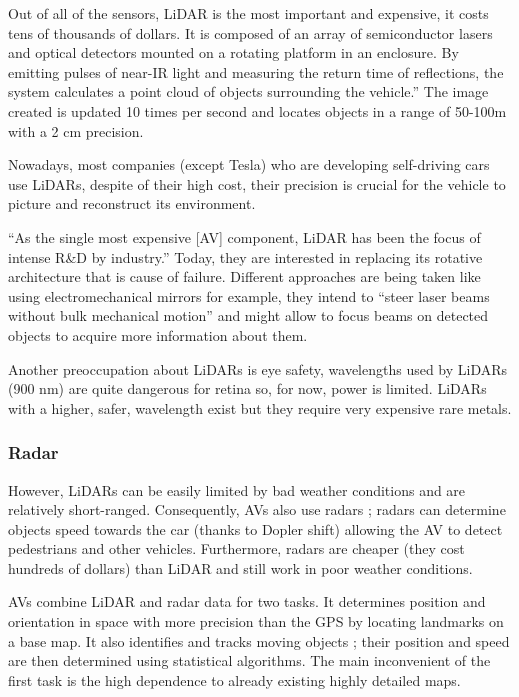Out of all of the sensors, LiDAR is the most important and expensive, it costs tens of thousands of dollars. It is composed of an array of semiconductor lasers and optical detectors mounted on a rotating platform in an enclosure. By emitting pulses of near-IR light and measuring the return time of reflections, the system calculates a point cloud of objects surrounding the vehicle.”\cite{mccormick_self-driving_2019} The image created is updated 10 times per second and locates objects in a range of 50-100m with a 2 cm precision.
\smallskip

Nowadays, most companies (except Tesla) who are developing self-driving cars use LiDARs, despite of their high cost, their precision is crucial for the vehicle to picture and reconstruct its environment.
\smallskip

“As the single most expensive [AV] component, LiDAR has been the focus of intense R\&D by industry.”\cite{mccormick_self-driving_2019} Today, they are interested in replacing its rotative architecture that is cause of failure. Different approaches are being taken like using electromechanical mirrors for example, they intend to “steer laser beams without bulk mechanical motion”\cite{mccormick_self-driving_2019} and might allow to focus beams on detected objects to acquire more information about them.
\smallskip

Another preoccupation about LiDARs is eye safety, wavelengths used by LiDARs (900 nm) are quite dangerous for retina so, for now, power is limited. LiDARs with a higher, safer, wavelength exist but they require very expensive rare metals.

\subsubsection{Radar}

However, LiDARs can be easily limited by bad weather conditions and are relatively short-ranged. Consequently, AVs also use radars ; radars can determine objects speed towards the car (thanks to Dopler shift) allowing the AV to detect pedestrians and other vehicles. Furthermore, radars are cheaper (they cost hundreds of dollars) than LiDAR and still work in poor weather conditions.

\smallskip
AVs combine LiDAR and radar data for two tasks. It determines position and orientation in space with more precision than the GPS by locating landmarks on a base map. It also identifies and tracks moving objects ; their position and speed are then determined using statistical algorithms. The main inconvenient of the first task is the high dependence to already existing highly detailed maps.

